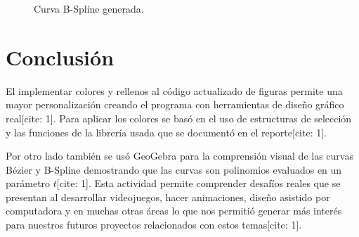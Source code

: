 \documentclass[12pt,letterpaper]{article}
\begin{document}
\begin{figure}[H]
    \centering
    \caption{Curva B-Spline generada.}
    \label{fig:curva_bspline}
\end{figure}


\section{Conclusión}
\label{sec:conclusiones}

El implementar colores y rellenos al código actualizado de figuras permite una mayor personalización creando el programa con herramientas de diseño gráfico real[cite: 1]. Para aplicar los colores se basó en el uso de estructuras de selección y las funciones de la librería usada que se documentó en el reporte[cite: 1]. 

Por otro lado también se usó GeoGebra para la comprensión visual de las curvas Bézier y B-Spline demostrando que las curvas son polinomios evaluados en un parámetro $t$[cite: 1]. Esta actividad permite comprender desafíos reales que se presentan al desarrollar videojuegos, hacer animaciones, diseño asistido por computadora y en muchas otras áreas lo que nos permitió generar más interés para nuestros futuros proyectos relacionados con estos temas[cite: 1].
\end{document}
